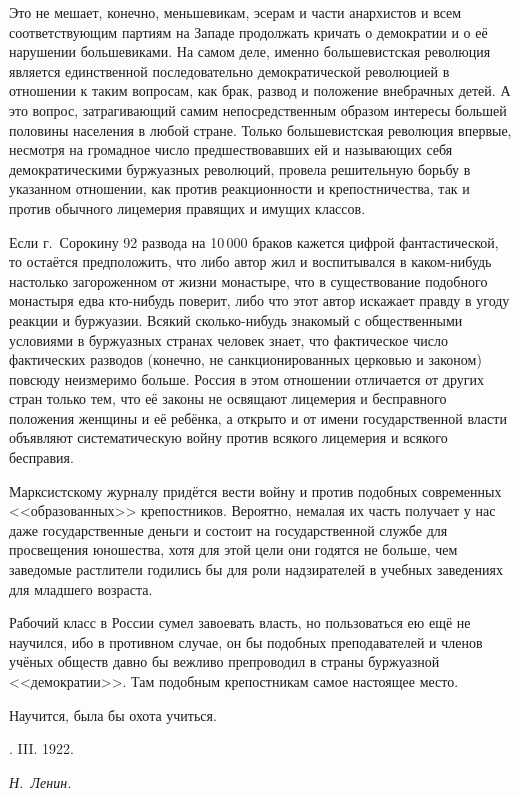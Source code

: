 Это не мешает, конечно, меньшевикам, эсерам и части анархистов и всем
соответствующим партиям на Западе продолжать кричать о демократии и о её
нарушении большевиками. На самом деле, именно большевистская революция
является единственной последовательно демократической революцией в
отношении к таким вопросам, как брак, развод и положение внебрачных детей.
А это вопрос, затрагивающий самим непосредственным образом интересы большей
половины населения в любой стране. Только большевистская революция впервые,
несмотря на громадное число предшествовавших ей и называющих себя
демократическими буржуазных революций, провела решительную борьбу в
указанном отношении, как против реакционности и крепостничества, так и
против обычного лицемерия правящих и имущих классов.

Если г.~Сорокину 92 развода на 10\,000 браков кажется
цифрой фантастической, то остаётся предположить, что либо автор жил и
воспитывался в каком-нибудь настолько загороженном от жизни монастыре, что
в существование подобного монастыря едва кто-нибудь поверит, либо что этот
автор искажает правду в угоду реакции и буржуазии. Всякий сколько-нибудь
знакомый с общественными условиями в буржуазных странах человек знает, что
фактическое число фактических разводов (конечно, не санкционированных
церковью и законом) повсюду неизмеримо больше. Россия в этом отношении
отличается от других стран только тем, что её законы не освящают лицемерия
и бесправного положения женщины и её ребёнка, а открыто и от имени
государственной власти объявляют систематическую войну против всякого
лицемерия и всякого бесправия.

Марксистскому журналу придётся вести войну и против подобных современных
<<образованных>> крепостников. Вероятно, немалая их часть получает у нас даже
государственные деньги и состоит на государственной службе для просвещения
юношества, хотя для этой цели они годятся не больше, чем заведомые
растлители годились бы для роли надзирателей в учебных заведениях для
младшего возраста.

Рабочий класс в России сумел завоевать власть, но пользоваться ею ещё не
научился, ибо в противном случае, он бы подобных преподавателей и членов
учёных обществ давно бы вежливо препроводил в страны буржуазной
<<демократии>>. Там подобным крепостникам самое настоящее место.

\nopagebreak
Научится, была бы охота учиться.

\nopagebreak \medskip
{}. III. 1922.
\nopagebreak \medskip

{\raggedleft \textit{Н.~Ленин.} \par}

\bigskip
























